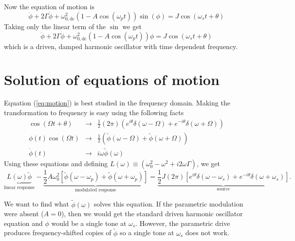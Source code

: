\documentclass{article}
\begin{document}
Now the equation of motion is \begin{equation}
\ddot{\phi} + 2\Gamma \dot{\phi} + \omega_{0,\textrm{dc}}^2(1 - A \cos(\omega_p t))\sin(\phi) = J\cos(\omega_s t + \theta) \end{equation}
Taking only the linear term of the $\sin$ we get \begin{equation}
\ddot{\phi} + 2\Gamma \dot{\phi} + \omega_{0,\textrm{dc}}^2(1 - A \cos(\omega_p t))\phi = J\cos(\omega_s t + \theta) \label{eq:motion} \end{equation}
which is a driven, damped harmonic oscillator with time dependent frequency.

\section{Solution of equations of motion}

Equation (\ref{eq:motion}) is best studied in the frequency domain.
Making the transformation to frequency is easy using the following facts \begin{eqnarray}
\cos(\Omega t + \theta) &\rightarrow& \frac{1}{2}(2\pi)\left(e^{i \theta}\delta(\omega - \Omega) + e^{-i \theta} \delta(\omega + \Omega) \right) \nonumber \\
\phi(t)\cos(\Omega t) &\rightarrow& \frac{1}{2}\left( \tilde{\phi}(\omega-\Omega) + \tilde{\phi}(\omega+\Omega) \right) \nonumber \\
\dot{\phi}(t) &\rightarrow& i\omega \tilde{\phi}(\omega) \nonumber \end{eqnarray}
Using these equations and defining $L(\omega) \equiv (\omega_0^2 - \omega^2 +i2\omega\Gamma)$, we get \begin{equation}
\underbrace{L(\omega) \tilde{\phi}}_{\text{linear response}}
- \underbrace{\frac{1}{2} A \omega_0^2 \left[ \tilde{\phi}(\omega - \omega_p) + \tilde{\phi}(\omega + \omega_p) \right]}_{\text{modulated response}}
= \underbrace{\frac{1}{2}J(2\pi)\left[e^{i \theta}\delta(\omega-\omega_s) + e^{-i\theta}\delta(\omega+\omega_s) \right]}_{\text{source}} . \label{eq:eqOfMotionFrequency} \end{equation}

We want to find what $\tilde{\phi}(\omega)$ solves this equation.
If the parametric modulation were absent ($A=0$), then we would get the standard driven harmonic oscillator equation and $\phi$ would be a single tone at $\omega_s$.
However, the parametric drive produces frequency-shifted copies of $\tilde\phi$ so a single tone at $\omega_s$ does not work.
\end{document}
